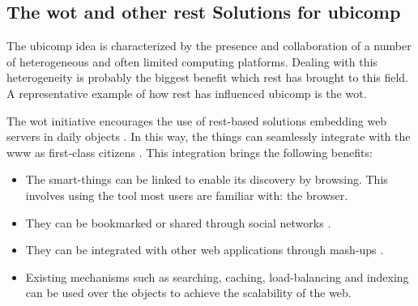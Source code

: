 \subsection{The \acl{wot} and other \ac{rest} Solutions for \acs{ubicomp}}

The \ac{ubicomp} idea is characterized by the presence and collaboration of a number of heterogeneous and often limited computing platforms.
Dealing with this heterogeneity is probably the biggest benefit which \ac{rest} has brought to this field.
A representative example of how \ac{rest} has influenced \ac{ubicomp} is the \acf{wot}.




The \acl{wot} initiative encourages the use of \acs{rest}-based solutions embedding web servers in daily objects \citep{guinard_internet_2011,guinard_thesis_2011}.
In this way, the things can seamlessly integrate with the \ac{www} as first-class citizens \citep{gupta_network_2011}. %
This integration brings the following benefits:
\begin{itemize}
  \item The smart-things can be linked to enable its discovery by browsing.
	This involves using the tool most users are familiar with: the browser.
  \item They can be bookmarked or shared through social networks \citep{guinard_sharing_2010}.
  \item They can be integrated with other web applications through mash-ups \citep{guinard_towards_2009,ostermaier_webplug:_2010,pintus_anatomy_2011}.
  \item Existing mechanisms such as searching, caching, load-balancing and indexing can be used over the objects to achieve the scalability of the web. %
\end{itemize}




